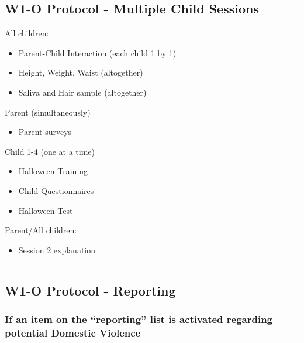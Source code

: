 \documentclass[
]{book}
\providecommand{\tightlist}{%
  \setlength{\itemsep}{0pt}\setlength{\parskip}{0pt}}
\begin{document}
\hypertarget{w1-o-protocol---multiple-child-sessions}{%
\subsection{W1-O Protocol - Multiple Child Sessions}\label{w1-o-protocol---multiple-child-sessions}}

All children:

\begin{itemize}
\tightlist
\item
  Parent-Child Interaction (each child 1 by 1)
\item
  Height, Weight, Waist (altogether)
\item
  Saliva and Hair sample (altogether)
\end{itemize}

Parent (simultaneously)

\begin{itemize}
\tightlist
\item
  Parent surveys
\end{itemize}

Child 1-4 (one at a time)

\begin{itemize}
\tightlist
\item
  Halloween Training
\item
  Child Questionnaires
\item
  Halloween Test
\end{itemize}

Parent/All children:

\begin{itemize}
\tightlist
\item
  Session 2 explanation
\end{itemize}

\begin{center}\rule{0.5\linewidth}{0.5pt}\end{center}

\hypertarget{w1-o-protocol---reporting}{%
\subsection{W1-O Protocol - Reporting}\label{w1-o-protocol---reporting}}

\hypertarget{if-an-item-on-the-reporting-list-is-activated-regarding-potential-domestic-violence}{%
\subsubsection{If an item on the ``reporting'' list is activated regarding potential Domestic Violence}\label{if-an-item-on-the-reporting-list-is-activated-regarding-potential-domestic-violence}}
\end{document}
